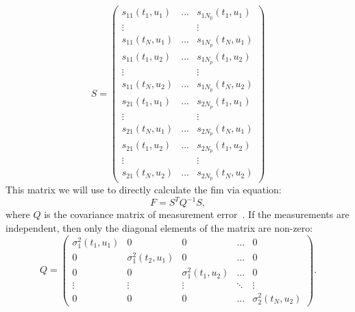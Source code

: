\documentclass[10pt,A4paper]{article}
\begin{document}
\begin{equation}
    S = 
\begin{pmatrix}
s_{11} (t_1, u_1) & ... & s_{1 N_p}(t_1, u_1) \\
\vdots  &   & \vdots  \\
s_{11} (t_{N}, u_1) & ... & s_{1 N_p} (t_{N}, u_1)\\
s_{11} (t_1, u_2) & ... & s_{1 N_p}(t_1, u_2) \\
\vdots  &   & \vdots  \\
s_{11} (t_N, u_2) & ... & s_{1 N_p} (t_N, u_2)\\

s_{21} (t_1, u_1) & ... & s_{2 N_p}(t_1, u_1) \\
\vdots  &   & \vdots  \\
s_{21} (t_{N}, u_1) & ... & s_{2 N_p} (t_{N}, u_1)\\
s_{21} (t_1, u_2) & ... & s_{2 N_p}(t_1, u_2) \\
\vdots  &   & \vdots  \\
s_{21} (t_N, u_2) & ... & s_{2 N_p} (t_N, u_2)
\end{pmatrix}
\label{eq:sens_matrix}
\end{equation}
This matrix we will use to directly calculate the \ac{fim} via equation:
\begin{equation}
    F = S^T Q^{-1} S,
\end{equation}
where $Q$ is the covariance matrix of measurement error~\cite{a_l_lloyd_sensitivity_2009, balsa-cantoComputationalProcedures2008}.
If the measurements are independent, then only the diagonal elements of the matrix are non-zero:
\begin{equation}
    Q = 
\begin{pmatrix}
    \sigma_{1}^2(t_1, u_1) & 0                      & 0                      & \dots  & 0                     \\
    0                      & \sigma_{1}^2(t_2, u_1) & 0                      & \dots  & 0                     \\
    0                      & 0                      & \sigma_{1}^2(t_1, u_2) & \dots  & 0                     \\
    \vdots                 & \vdots                 & \vdots                 & \ddots & \vdots                \\
    0                      & 0                      & 0                      & \dots  & \sigma_{2}^2(t_N, u_2)
\end{pmatrix}.
\label{eq:covar_matrix}
\end{equation}
\end{document}
